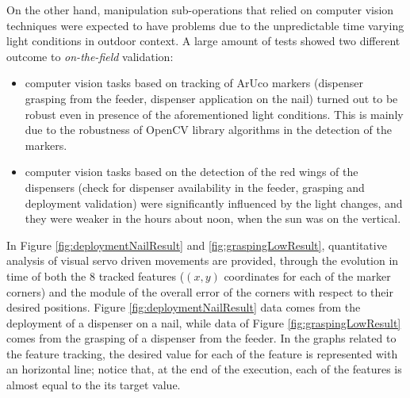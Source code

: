 On the other hand, manipulation sub-operations that relied on computer vision techniques were expected to have problems due to the unpredictable time varying light conditions in outdoor context. A large amount of tests showed two different outcome to \textit{on-the-field} validation:
\begin{itemize}
	\item computer vision tasks based on tracking of ArUco markers (dispenser grasping from the feeder, dispenser application on the nail) turned out to be robust even in presence of the aforementioned light conditions. This is mainly due to the robustness of OpenCV library algorithms in the detection of the markers.
	\item computer vision tasks based on the detection of the red wings of the dispensers (check for dispenser availability in the feeder, grasping and deployment validation) were significantly influenced by the light changes, and they were weaker in the hours about noon, when the sun was on the vertical.
\end{itemize}

In Figure \ref{fig:deploymentNailResult} and \ref{fig:graspingLowResult}, quantitative analysis of visual servo driven movements are provided, through the evolution in time of both the 8 tracked features ($(x,y)$ coordinates for each of the marker corners) and the module of the overall error of the corners with respect to their desired positions. Figure \ref{fig:deploymentNailResult} data comes from the deployment of a dispenser on a nail, while data of Figure \ref{fig:graspingLowResult} comes from the grasping of a dispenser from the feeder. In the graphs related to the feature tracking, the desired value for each of the feature is represented with an horizontal line; notice that, at the end of the execution, each of the features is almost equal to the its target value.


